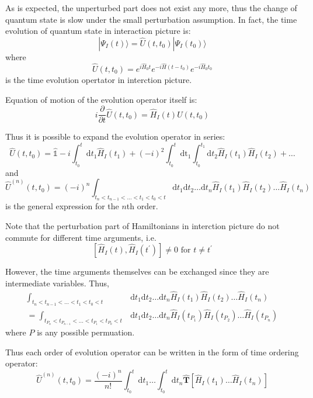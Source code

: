\documentclass[bachelor, english]{ustcthesis}
\begin{document}
As is expected, the unperturbed part does not exist any more, thus the change of quantum state is slow under the small perturbation assumption.
In fact, the time evolution of quantum state in interaction picture is:
$$
| \Psi_{I}(t) \rangle=\hat{U}\left(t, t_{0}\right) | \Psi_{I}\left(t_{0}\right) \rangle
$$
where
$$
\hat{U}\left(t, t_{0}\right)=e^{i \hat{H}_{0} t} e^{-i \hat{H}\left(t-t_{0}\right)} e^{-i \hat{H}_{0} t_{0}}
$$
is the time evolution opertator in interction picture.

Equation of motion of the evolution operator itself is:
$$
i \frac{\partial}{\partial t} \hat{U}\left(t, t_{0}\right)=\hat{H}_{I}(t) U\left(t, t_{0}\right)
$$

Thus it is possible to expand the evolution operator in series:
$$
\hat{U}\left(t, t_{0}\right)=\hat{\mathbb{1}}-i \int_{t_{0}}^{t} \mathrm{d} t_{1} \hat{H}_{I}\left(t_{1}\right)+(-i)^{2} \int_{t_{0}}^{t} \mathrm{dt}_{1} \int_{t_{0}}^{t_{1}} \mathrm{d} t_{2} \hat{H}_{I}\left(t_{1}\right) \hat{H}_{I}\left(t_{2}\right)+\ldots
$$
and
$$
\hat{U}^{(n)}\left(t, t_{0}\right)=
(-i)^{n} \int_{t_n<t_{n-1}<\dots<t_1<t_0<t} \mathrm{d} t_{1} \mathrm{d} t_{2} \ldots \mathrm{d} t_{n} \hat{H}_{I}\left(t_{1}\right) \hat{H}_{I}\left(t_{2}\right) \ldots \hat{H}_{I}\left(t_{n}\right)
$$
is the general expression for the $n$th order.

Note that the perturbation part of Hamiltonians in interction picture do not commute for different time arguments, i.e.
$$
\left[\hat{H}_{I}(t), \hat{H}_{I}\left(t^{\prime}\right)\right] \neq 0 \text { for } t \neq t^{\prime}
$$

However, the time arguments themselves can be exchanged since they are intermediate variables.
Thus,
$$
\begin{aligned}
	\int_{t_n<t_{n-1}<\dots<t_1<t_0<t} &\mathrm{d} t_{1} \mathrm{d} t_{2} \ldots \mathrm{d} t_{n} \hat{H}_{I}\left(t_{1}\right) \hat{H}_{I}\left(t_{2}\right) \ldots \hat{H}_{I}\left(t_{n}\right)
	\\
	=\int_{t_{P_n}<t_{P_{n-1}}<\dots<t_{P_1}<t_{P_0}<t} &\mathrm{d} t_{1} \mathrm{d} t_{2} \ldots \mathrm{d} t_{n} \hat{H}_{I}\left(t_{P_1}\right) \hat{H}_{I}\left(t_{P_2}\right) \ldots \hat{H}_{I}\left(t_{P_n}\right)
\end{aligned}
$$
where $P$ is any possible permuation.

Thus each order of evolution operator can be written in the form of time ordering operator:
$$
\hat{U}^{(n)}\left(t, t_{0}\right)=\frac{(-i)^{n}}{n !} \int_{t_{0}}^{t} \mathrm{d} t_{1} \ldots \int_{t_{0}}^{t} \mathrm{d} t_{n} \hat{\boldsymbol{T}}\left[\hat{H}_{I}\left(t_{1}\right) \ldots \hat{H}_{I}\left(t_{n}\right)\right]
$$
\end{document}
